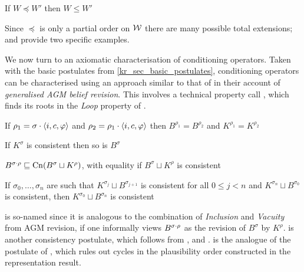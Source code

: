 
\begin{axiom}[\refinement{}]
    If $W \preceq W'$ then $W \le W'$
\end{axiom}

Since $\preceq$ is only a partial order on $\mathcal{W}$ there are many possible total
extensions; \varbasedcond{} and \partbasedcond{} provide two specific examples.

We now turn to an axiomatic characterisation of conditioning operators.
Taken with the basic postulates from \cref{kr_sec_basic_postulates},
conditioning operators can be characterised using an approach similar to that of
\textcite{delgrande2018general} in their account of \emph{generalised AGM belief
revision}.\footnotemark{} This involves a technical property
\citeauthor{delgrande2018general}
call , which finds its roots in the \emph{Loop}
property of \textcite{kraus1990nonmonotonic}.
%

\begin{axiomlist}
\begin{axiom}[\duprem{}]
    If $\rho_1 = \sigma \cdot \langle {i, c, \varphi} \rangle$ and $\rho_2 = \rho_1
    \cdot \langle {i, c, \varphi} \rangle$ then $B^{\rho_1} = B^{\rho_2}$ and
    $K^{\rho_1} = K^{\rho_2}$
\end{axiom}
\begin{axiom}[\condcons{}]
    If $K^\sigma$ is consistent then so is $B^\sigma$
\end{axiom}
\begin{axiom}[\incvac{}]
    $B^{\sigma \cdot \rho} \sqsubseteq \operatorname{Cn}(B^\sigma \sqcup K^\rho)$, with
    equality if $B^\sigma \sqcup K^\rho$ is consistent
\end{axiom}
\begin{axiom}[\acyc{}]
    If $\sigma_0, \ldots, \sigma_n$ are such that $K^{\sigma_j} \sqcup
    B^{\sigma_{j+1}}$ is consistent for all $0 \le j < n$ and $K^{\sigma_n}
    \sqcup B^{\sigma_0}$ is consistent, then $K^{\sigma_0} \sqcup B^{\sigma_n}$
    is consistent
\end{axiom}
\end{axiomlist}

\incvac{} is so-named since it is analogous to the combination of
\emph{Inclusion} and \emph{Vacuity} from AGM revision, if one informally views
$B^{\sigma \cdot \rho}$ as the revision of $B^\sigma$ by $K^\rho$.
%
\condcons{} is another consistency postulate, which follows from
\consistency{},  \closure{} and \soundness{}.
%
\acyc{} is the analogue of the postulate of \citeauthor{delgrande2018general},
which rules out cycles in the plausibility order
constructed in the representation result.

